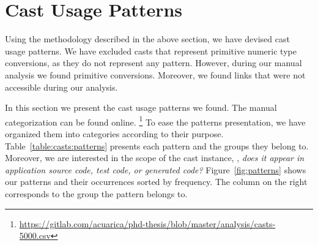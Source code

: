 
\newcommand{\castpatternsection}[1]{\noindent\textbf{#1.}}
\newcommand{\pname}[1]{\textsc{#1}}
\newcommand{\group}[1]{

\

\

{\noindent\Large\textsc{#1} Patterns}

\

\begin{figure}[ht!]
\centering
\texttt{[image: "analysis/table-patterns-5000-by-group-\#1"]}
\caption{Cast Patterns Occurrences}
\label{fig:group-patterns:#1}
\end{figure}

}

\newenvironment{pattern}[1]{
	\newcommand{\desc}{\castpatternsection{Description}}
	\newcommand{\instances}{\castpatternsection{Instances}}
	\newcommand{\detection}{\castpatternsection{Detection}}
	\newcommand{\discussion}{\castpatternsection{Discussion}}
	\newcommand{\related}{\castpatternsection{Related Patterns}}
    \newcommand{\thisp}{\textsc{#1}}
    \subsection{\pname{#1}}
    \label{pat:#1}
	\desc
}{}


\section{Cast Usage Patterns}
\label{sec:casts:patterns}

Using the methodology described in the above section,
we have devised \npattern{} cast usage patterns.
We have excluded casts that represent primitive numeric type conversions,
as they do not represent any pattern.
However, during our manual analysis we found \nprim{} primitive conversions.
Moreover, we found \nbrokenlinks{} links that were not accessible during our analysis.

In this section we present the cast usage patterns we found.
The manual categorization can be found online.%
\footnote{\url{https://gitlab.com/acuarica/phd-thesis/blob/master/analysis/casts-5000.csv}}
To ease the patterns presentation,
we have organized them into \ngroup{} categories according to their purpose.
Table~\ref{table:casts:patterns} presents each pattern and the groups they belong to.
Moreover, we are interested in the scope of the cast instance,
\ie, \emph{does it appear in application source code, test code, or generated code?}
%
%
Figure~\ref{fig:patterns} shows our patterns and their occurrences sorted by frequency.
The column on the right corresponds to the group the pattern belongs to.


